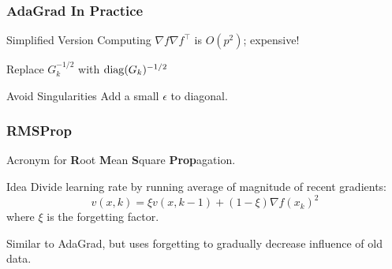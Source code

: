 \documentclass[aspectratio=1610,onlytextwidth]{beamer}
\begin{document}
\begin{frame}[c]
  \frametitle{AdaGrad In Practice}

  \begin{block}{Simplified Version}
    Computing \(\nabla f \nabla f^\intercal\) is \(O(p^2)\); expensive!

    \medskip

    Replace \(G^{-1/2}_k\) with \(\operatorname{diag}(G_k)^{-1/2}\)
  \end{block}

  \pause\bigskip

  \begin{block}{Avoid Singularities}
    Add a small \(\epsilon\) to diagonal.
  \end{block}

  \pause\bigskip

  \begin{algorithm}[H]
    \caption{Simplified AdaGrad}
  \end{algorithm}

\end{frame}

\begin{frame}[c]
  \frametitle{RMSProp}

  Acronym for \textbf{R}oot \textbf{M}ean \textbf{S}quare \textbf{Prop}agation.

  \begin{block}{Idea}
    Divide learning rate by running average of magnitude of recent gradients:
    \[
      v(x,k) = \xi v(x, k -1) + (1 - \xi)\nabla f(x_k)^2
    \]
    where \(\xi\) is the \alert{forgetting factor}.
  \end{block}

  \medskip

  Similar to AdaGrad, but uses \alert{forgetting} to gradually decrease influence of old data.

  \bigskip

  \begin{algorithm}[H]
    \For{$k \gets 1, 2, \dots$, $\xi \in [0, 1)$}{
    $v_k = \xi v_{k-1} + (1 - \xi) \nabla f(x_{k-1})$\;
    $x_k \gets x_{k-1} - \frac{\gamma}{\sqrt{v_k}} \odot \nabla f(x_{k-1})$\;
    }
    \caption{RMSProp}
  \end{algorithm}

\end{frame}
\end{document}
